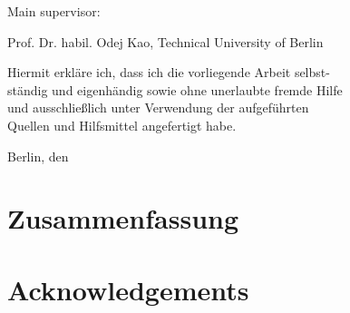 \rule{0cm}{20cm}

\noindent Main supervisor: 

\noindent Prof. Dr. habil. Odej Kao, Technical University of Berlin

\thispagestyle{empty}

\rule{0cm}{10cm}

\noindent Hiermit erkl\"are ich, dass ich die vorliegende Arbeit selbst-\\
st\"andig und eigenh\"andig sowie ohne unerlaubte fremde Hilfe \\
und ausschlie{\ss}lich unter Verwendung der aufgef\"uhrten \\
Quellen und Hilfsmittel angefertigt habe.
\vspace{1cm}

\noindent Berlin, den


\thispagestyle{empty}




\chapter*{Zusammenfassung}

\abstracttextde

\thispagestyle{empty}
\newpage
\vspace*{3cm}
\thispagestyle{empty}

\chapter*{Acknowledgements}

\acktext


\thispagestyle{empty}
\newpage
\vspace*{3cm}
\thispagestyle{empty}



\setcounter{page}{8}
\tableofcontents

\newpage


\listoffigures
\listoftables
\Listofabbrev
\newpage
\thispagestyle{empty}
\newpage
\vspace*{3cm}
\thispagestyle{empty} \newpage
{}\setcounter{page}{1}